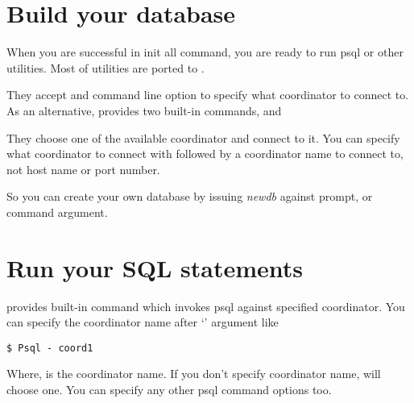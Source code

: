 
%
%
\chapter{Build your database}

  When you are successful in init all  command, you are ready to run psql or
  other utilities.
  Most of \PG{} utilities are ported to \XC.
  
  They accept  and  command line option to specify what coordinator to
  connect to.
  As an alternative,  provides two built-in commands,  and
  
  They choose one of the available coordinator and connect to it.
  You can specify what coordinator to connect with \file{-} followed by a coordinator name to
  connect to, not host name or port number.
  
  So you can create your own database by issuing  {\it newdb} against
   prompt, or  command argument.




%
%
\chapter{Run your SQL statements}

   provides  built-in command which invokes psql against specified coordinator.
  You can specify the coordinator name after `\file{-}' argument like
  
  \begin{lstlisting}[frame=single]
$ Psql - coord1
  \end{lstlisting}
  
  Where,  is the coordinator name.
  If you don't specify coordinator name,  will choose one.
  You can specify any other psql command options too.
  
